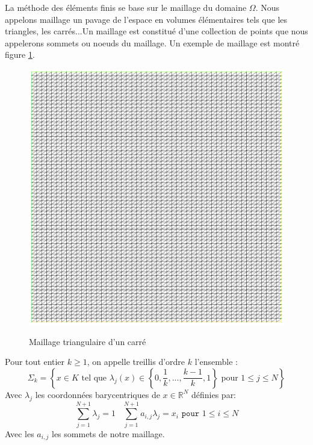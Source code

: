La méthode des éléments finis se base sur le maillage du domaine $\Omega$. Nous appelons maillage un pavage de l'espace en volumes élémentaires tels que les triangles, les carrés...Un maillage est constitué d'une collection de points que nous appelerons sommets ou noeuds du maillage. Un exemple de maillage est montré figure \ref{mail1}.
\begin{figure}[!h]
\hspace{-9em} \includegraphics[scale=0.85]{maillage.eps}\\
\caption{Maillage triangulaire d'un carré}
\label{mail1}
\end{figure}

Pour tout entier $k\geq 1$, on appelle treillis d'ordre $k$ l'ensemble :\\
\begin{equation*}
\Sigma_{k}=\left\{ x\in K \text{ tel que } \lambda_{j}\left(x\right)\in\left\{0, \frac{1}{k},...,\frac{k-1}{k}, 1\right\} \text{ pour }1\leq j\leq N\right\}
\end{equation*}
Avec $\lambda_{j}$ les coordonnées barycentriques de $x\in\mathbb{R}^{N}$ définies par:\\
\begin{equation*}
\sum_{j=1}^{N+1}\lambda_{j}=1 \;\;\;\sum_{j=1}^{N+1}a_{i,j}\lambda_{j}=x_{i} \texttt{ pour } 1\leq i \leq N
\end{equation*}
Avec les $a_{i,j}$ les sommets de notre maillage.\\

